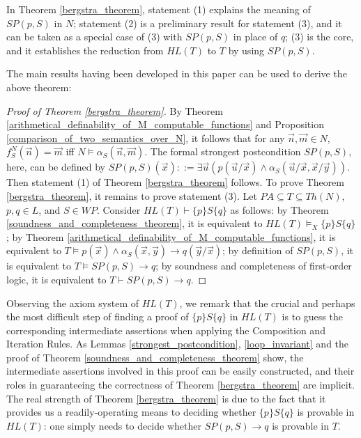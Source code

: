 \documentclass[a4paper,11pt]{article}
\begin{document}
In Theorem \ref{bergstra_theorem}, statement (1) explains the meaning of $SP(p,S)$ in $N$; statement (2) is a preliminary result for statement (3), and it can be taken as a special case of (3) with $SP(p,S)$ in place of $q$; (3) is the core, and it establishes the reduction from $HL(T)$ to $T$ by using $SP(p,S)$.

The main results having been developed in this paper can be used to derive the above theorem:

\begin{proof}[Proof of Theorem \ref{bergstra_theorem}]
By Theorem \ref{arithmetical_definability_of_M_computable_functions} and Proposition \ref{comparison_of_two_semantics_over_N}, it follows that for any $\vec{n},\vec{m}\in N$, $f_S^N(\vec{n}) = \vec{m}$ iff $N\models \alpha_S(\vec{n},\vec{m})$. The formal strongest postcondition $SP(p,S)$, here, can be defined by $SP(p,S)(\vec{x}) ::= \exists \vec{u} ( p(\vec{u}/\vec{x}) \wedge \alpha_S(\vec{u}/\vec{x},\vec{x}/\vec{y}) )$. Then statement (1) of Theorem \ref{bergstra_theorem} follows. To prove Theorem \ref{bergstra_theorem}, it remains to prove statement (3). Let $PA\subseteq T \subseteq Th(N)$, $p,q\in L$, and $S\in WP$. Consider $HL(T)\vdash \{p\}S\{q\}$ as follows: by Theorem \ref{soundness_and_completeness_theorem}, it is equivalent to $HL(T)\models_X \{p\}S\{q\}$; by Theorem \ref{arithmetical_definability_of_M_computable_functions}, it is equivalent to $T\models p(\vec{x})\wedge \alpha_S(\vec{x},\vec{y})\rightarrow q(\vec{y}/\vec{x})$; by definition of $SP(p,S)$, it is equivalent to $T\models SP(p,S)\rightarrow q$; by soundness and completeness of first-order logic, it is equivalent to $T\vdash SP(p,S)\rightarrow q$.
\end{proof}

Observing the axiom system of $HL(T)$, we remark that the crucial and perhaps the most difficult step of finding a proof of $\{p\}S\{q\}$ in $HL(T)$ is to guess the corresponding intermediate assertions when applying the Composition and Iteration Rules. As Lemmas \ref{strongest_postcondition}, \ref{loop_invariant} and the proof of Theorem \ref{soundness_and_completeness_theorem} show, the intermediate assertions involved in this proof can be easily constructed, and their roles in guaranteeing the correctness of Theorem \ref{bergstra_theorem} are implicit. The real strength of Theorem \ref{bergstra_theorem} is due to the fact that it provides us a readily-operating means to deciding whether $\{p\}S\{q\}$ is provable in $HL(T)$: one simply needs to decide whether $SP(p,S)\rightarrow q$ is provable in $T$.
\end{document}
